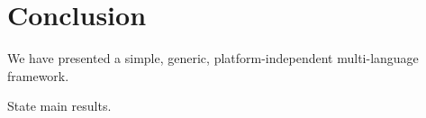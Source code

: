 \section{Conclusion}
We have presented a simple, generic, platform-independent
multi-language framework.

State main results.
